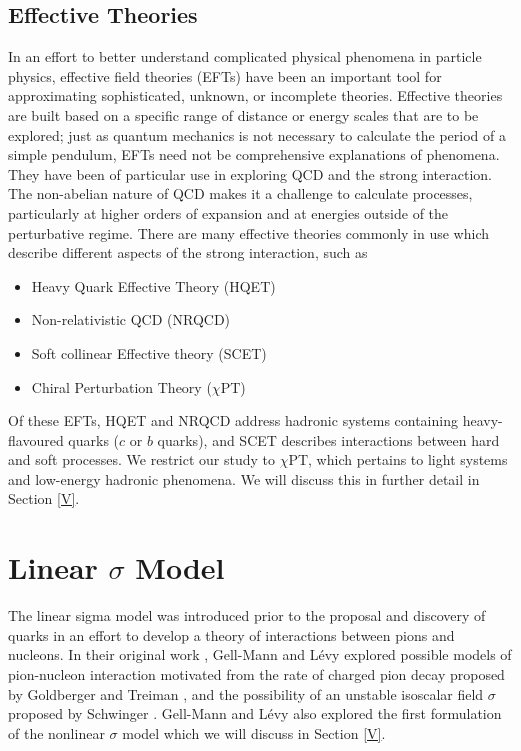 \documentclass[aps,prd,onecolumn,showpacs,amsmath,amssymb,nofootinbib, 11pt]{revtex4} \pdfoutput=1
\begin{document}
\subsection{Effective Theories}
In an effort to better understand complicated physical phenomena in particle physics, effective field theories (EFTs) have been an important tool for approximating sophisticated, unknown, or incomplete theories. Effective theories are built based on a specific range of distance or energy scales that are to be explored; just as quantum mechanics is not necessary to calculate the period of a simple pendulum, EFTs need not be comprehensive explanations of phenomena. They have been of particular use in exploring QCD and the strong interaction. The non-abelian nature of QCD makes it a challenge to calculate processes, particularly at higher orders of expansion and at energies outside of the perturbative regime. There are many effective theories commonly in use which describe different aspects of the strong interaction, such as
\begin{itemize}
    \item Heavy Quark Effective Theory (HQET)
    \item Non-relativistic QCD (NRQCD)
    \item Soft collinear Effective theory (SCET)
    \item Chiral Perturbation Theory ($\chi$PT)
\end{itemize}
Of these EFTs, HQET and NRQCD address hadronic systems containing heavy-flavoured quarks ($c$ or $b$ quarks), and SCET describes interactions between hard and soft processes. We restrict our study to $\chi$PT, which pertains to light systems and low-energy hadronic phenomena. We will discuss this in further detail in Section \ref{V}.
\section{Linear $\sigma$ Model}\label{IV}

The linear sigma model was introduced prior to the proposal and discovery of quarks in an effort to develop a theory of interactions between pions and nucleons. In their original work \cite{GellMann1960}, Gell-Mann and L\'evy explored possible models of pion-nucleon interaction motivated from the rate of charged pion decay proposed by Goldberger and Treiman \cite{Goldberger1958}, and the possibility of an unstable isoscalar field $\sigma$ proposed by Schwinger \cite{Schwinger1957}. Gell-Mann and L\'evy also explored the first formulation of the nonlinear $\sigma$ model which we will discuss in Section \ref{V}.
\end{document}
